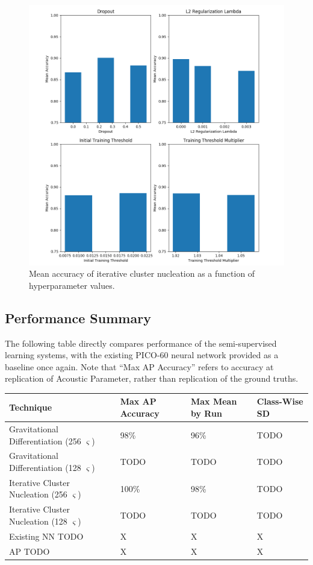 \documentclass[10pt]{article}
\begin{document}
\begin{figure}[H]
    \centering
    \includegraphics[width=\textwidth]{icn_acc_by_hyper}
    \caption{\label{icn_acc_by_hyper} Mean accuracy of iterative cluster nucleation as a function of hyperparameter values.}
\end{figure}

\subsection{Performance Summary}

The following table directly compares performance of the semi-supervised learning systems, with the existing PICO-60 neural network provided as a baseline once again. Note that ``Max AP Accuracy'' refers to accuracy at replication of Acoustic Parameter, rather than replication of the ground truths.

\begin{tabular}{|l|l|l|l|}
    \hline
    Technique & Max AP Accuracy & Max Mean by Run & Class-Wise SD \\
    \hline
    Gravitational Differentiation (256 $\varsigma$) & 98\% & 96\% & TODO \\
    \hline
    Gravitational Differentiation (128 $\varsigma$) & TODO & TODO & TODO \\
    \hline
    Iterative Cluster Nucleation (256 $\varsigma$) & 100\% & 98\% & TODO \\
    \hline
    Iterative Cluster Nucleation (128 $\varsigma$) & TODO & TODO & TODO \\
    \hline
    Existing NN TODO & X & X & X \\
    \hline
    AP TODO & X & X & X \\
    \hline
\end{tabular}
\end{document}
